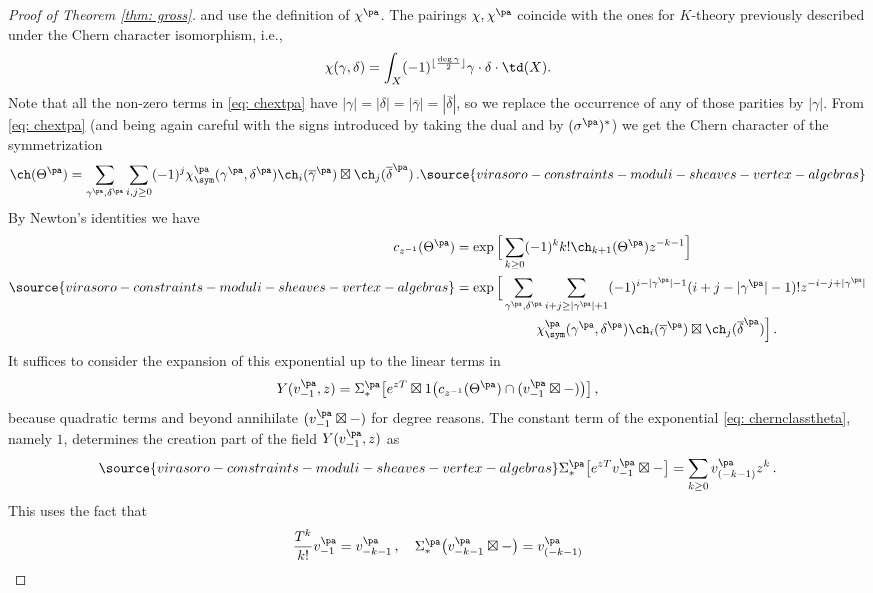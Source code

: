 \begin{proof}[Proof of Theorem \ref{thm: gross}]
and use the definition of $\chi^{\pa}$.
The pairings $\chi, \chi^{\pa}$ coincide with the ones for $K$-theory previously described under the Chern character isomorphism, i.e.,
\[\chi(\gamma, \delta)=\int_X(-1)^{\lfloor\frac{\deg \gamma}{2}\rfloor}\gamma\cdot \delta \cdot \td(X).\]
Note that all the non-zero terms in \eqref{eq: chextpa} have $|\gamma|=|\delta|=|\overline \gamma|=|\overline \delta|$, so we replace the occurrence of any of those parities by $|\gamma|$.
From \eqref{eq: chextpa} (and being again careful with the signs introduced by taking the dual and by $(\sigma^{\pa})^\ast$) we get the Chern character of the symmetrization
\begin{equation}
\label{eq: chthetapa} \ch(\Theta^{\pa})=\sum_{\gamma^{\pa}, \delta^{\pa}}\sum_{i, j\geq 0}(-1)^{j}\chi^{\pa}_\sym(\gamma^{\pa}, \delta^{\pa})\ch_i(\overline \gamma^{\pa})\boxtimes\ch_j(\overline \delta^{\pa})\,.
\source{virasoro-constraints-moduli-sheaves-vertex-algebras}
\end{equation}
By Newton's identities we have
\begin{align}\label{eq: chernclasstheta}c_{z^{-1}}(\Theta^{\pa})&=\exp\Big[\sum_{k\geq 0}(-1)^{k}k!\ch_{k+1}(\Theta^{\pa})z^{-k-1}\Big]\\ \nonumber
\source{virasoro-constraints-moduli-sheaves-vertex-algebras}
&=\exp\Big[\sum_{\gamma^{\pa}, \delta^{\pa}}\sum_{i+j\geq |\gamma^{\pa}|+1}(-1)^{i-|\gamma^{\pa}|-1}(i+j-|\gamma^{\pa}|-1)!z^{-i-j+|\gamma^{\pa}|}\\
&\qquad \qquad\qquad \chi^{\pa}_\sym(\gamma^{\pa}, \delta^{\pa})\ch_i(\overline \gamma^{\pa})\boxtimes\ch_j(\overline \delta^{\pa})\Big]\, .\nonumber
\end{align}
It suffices to consider the expansion of this exponential up to the linear terms in
$$Y(v^{\pa}_{-1},z)= \Sigma_\ast^{\pa}\big[e^{zT}\boxtimes 1\big(c_{z^{-1}}(\Theta^{\pa})\cap (v^{\pa}_{-1}\boxtimes -)\big)\big]\,,
$$
because quadratic terms and beyond annihilate $(v^{\pa}_{-1}\boxtimes -)$ for degree reasons. The constant term of the exponential \eqref{eq: chernclasstheta}, namely $1$, determines the creation part of the field $Y(v^{\pa}_{-1},z)$ as
\begin{equation}\label{eq: creation part}
\source{virasoro-constraints-moduli-sheaves-vertex-algebras}
    \Sigma_\ast^{\pa}\big[e^{zT} v_{-1}^{\pa}\boxtimes -\big]=\sum_{k\geq 0}v^{\pa}_{(-k-1)}z^k\,.
\end{equation}
This uses the fact that
\[\frac{T^k}{k!} v_{-1}^{\pa}=v_{-k-1}^{\pa}\,, \quad \Sigma_\ast^{\pa}\big(v_{-k-1}^{\pa}\boxtimes -\big)=v_{(-k-1)}^{\pa}\]

\end{proof}
